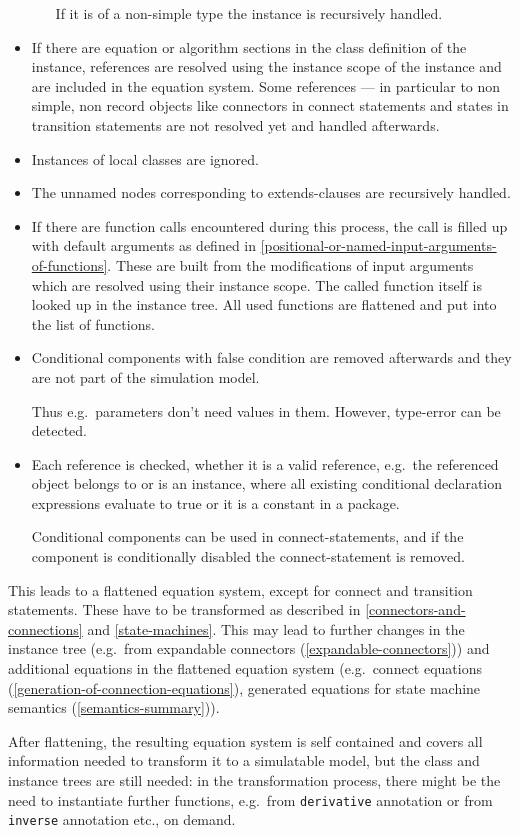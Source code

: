 \begin{itemize}
\begin{itemize}
    If it is of a non-simple type the instance is recursively handled.
  \end{itemize}
\item
  If there are equation or algorithm sections in the class definition of
  the instance, references are resolved using the instance scope of the
  instance and are included in the equation system. Some references ---
  in particular to non simple, non record objects like connectors in
  connect statements and states in transition statements are not
  resolved yet and handled afterwards.
\item
  Instances of local classes are ignored.
\item
  The unnamed nodes corresponding to extends-clauses are recursively
  handled.
\item
  If there are function calls encountered during this process, the call
  is filled up with default arguments as defined in \cref{positional-or-named-input-arguments-of-functions}. These are
  built from the modifications of input arguments which are resolved
  using their instance scope. The called function itself is looked up in
  the instance tree. All used functions are flattened and put into the
  list of functions.
\item
  Conditional components with false condition are removed afterwards and
  they are not part of the simulation model.
  \begin{nonnormative}
  Thus e.g.\ parameters don't need values in them. However, type-error can be detected.
  \end{nonnormative}
\item
  Each reference is checked, whether it is a valid reference, e.g.\ the
  referenced object belongs to or is an instance, where all existing
  conditional declaration expressions evaluate to true or it is a
  constant in a package.
  \begin{nonnormative}
  Conditional components can be used in connect-statements, and if the component is conditionally disabled the connect-statement is removed.
  \end{nonnormative}
\end{itemize}

This leads to a flattened equation system, except for connect and transition statements. These have to be transformed as described in
\cref{connectors-and-connections} and \cref{state-machines}.  This may lead to further changes in the instance tree (e.g.\ from expandable connectors
(\cref{expandable-connectors})) and additional equations in the flattened equation system (e.g.\ connect equations (\cref{generation-of-connection-equations}),
generated equations for state machine semantics (\cref{semantics-summary})).

\begin{nonnormative}
After flattening, the resulting equation system is self
contained and covers all information needed to transform it to a
simulatable model, but the class and instance trees are still needed: in
the transformation process, there might be the need to instantiate
further functions, e.g.\ from \lstinline!derivative! annotation or from \lstinline!inverse!
annotation etc., on demand.
\end{nonnormative}
